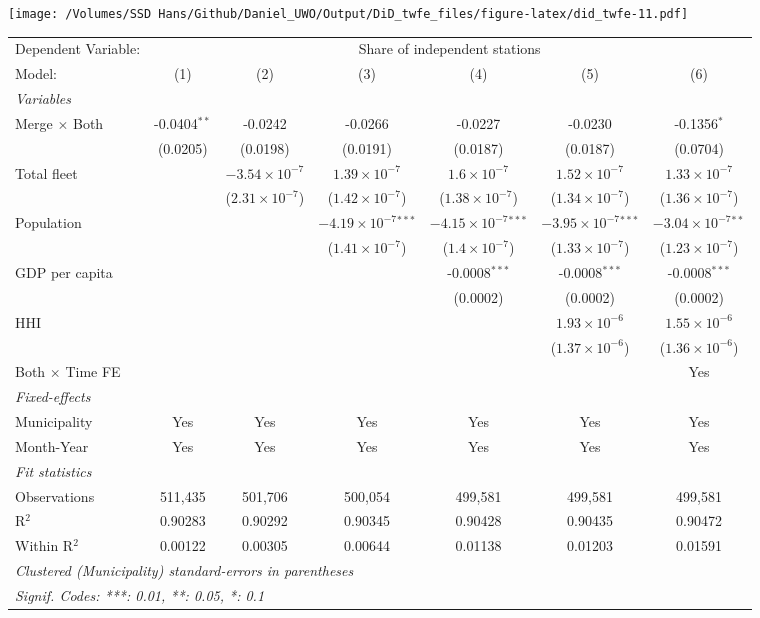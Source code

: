 \documentclass[
]{article}
\begin{document}
\texttt{[image: /Volumes/SSD Hans/Github/Daniel\_UWO/Output/DiD\_twfe\_files/figure-latex/did\_twfe-11.pdf]}

\begin{tabular}{lcccccc}
\tabularnewline\midrule\midrule
Dependent Variable:&\multicolumn{6}{c}{Share of independent stations}\\
Model:&(1) & (2) & (3) & (4) & (5) & (6)\\
\midrule \emph{Variables}&   &   &   &   &   &  \\
Merge $\times $ Both & -0.0404$^{**}$ & -0.0242 & -0.0266 & -0.0227 & -0.0230 & -0.1356$^{*}$\\
  &(0.0205) & (0.0198) & (0.0191) & (0.0187) & (0.0187) & (0.0704)\\
Total fleet &    & $-3.54\times 10^{-7}$ & $1.39\times 10^{-7}$ & $1.6\times 10^{-7}$ & $1.52\times 10^{-7}$ & $1.33\times 10^{-7}$\\
  &   & ($2.31\times 10^{-7}$) & ($1.42\times 10^{-7}$) & ($1.38\times 10^{-7}$) & ($1.34\times 10^{-7}$) & ($1.36\times 10^{-7}$)\\
Population &    &    & $-4.19\times 10^{-7}$$^{***}$ & $-4.15\times 10^{-7}$$^{***}$ & $-3.95\times 10^{-7}$$^{***}$ & $-3.04\times 10^{-7}$$^{**}$\\
  &   &    & ($1.41\times 10^{-7}$) & ($1.4\times 10^{-7}$) & ($1.33\times 10^{-7}$) & ($1.23\times 10^{-7}$)\\
GDP per capita &    &    &    & -0.0008$^{***}$ & -0.0008$^{***}$ & -0.0008$^{***}$\\
  &   &    &    & (0.0002) & (0.0002) & (0.0002)\\
HHI &    &    &    &    & $1.93\times 10^{-6}$ & $1.55\times 10^{-6}$\\
  &   &    &    &    & ($1.37\times 10^{-6}$) & ($1.36\times 10^{-6}$)\\
Both $\times$ Time FE &  &  &  &  &  & Yes\\
\midrule \emph{Fixed-effects}&   &   &   &   &   &  \\
Municipality & Yes & Yes & Yes & Yes & Yes & Yes\\
Month-Year & Yes & Yes & Yes & Yes & Yes & Yes\\
\midrule \emph{Fit statistics}&  & & & & & \\
Observations & 511,435&501,706&500,054&499,581&499,581&499,581\\
R$^2$ & 0.90283&0.90292&0.90345&0.90428&0.90435&0.90472\\
Within R$^2$ & 0.00122&0.00305&0.00644&0.01138&0.01203&0.01591\\
\midrule\midrule\multicolumn{7}{l}{\emph{Clustered (Municipality) standard-errors in parentheses}}\\
\multicolumn{7}{l}{\emph{Signif. Codes: ***: 0.01, **: 0.05, *: 0.1}}\\
\end{tabular}
\end{document}
